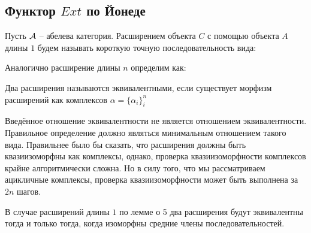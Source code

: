 \documentclass[../main.tex]{subfiles}
\begin{document}
\subsection{Функтор $Ext$ по Йонеде}
\begin{to_def}
Пусть $\mathcal{A}$ -- абелева категория. Расширением объекта $C$ с помощью объекта $A$ длины $1$ будем называть короткую точную последовательность вида:
\bee
{}
\eee
Аналогично расширение длины $n$ определим как:
\bee
{}
\eee
\end{to_def}
\begin{to_not_def}
Два расширения называются эквивалентными, если существует морфизм расширений как комплексов $\alpha = \{\alpha_i\}_i^{n}$
\bee
{}
\eee
\end{to_not_def}
\begin{to_com}
Введённое отношение эквивалентности не является отношением эквивалентности. Правильное определение должно являться минимальным отношением такого вида. Правильнее было бы сказать, что расширения должны быть квазиизоморфны как комплексы, однако, проверка квазиизоморфности комплексов крайне алгоритмически сложна. Но в силу того, что мы рассматриваем ацикличные комплексы, проверка квазиизоморфности может быть выполнена за $2n$ шагов.
\end{to_com}
В случае расширений длины $1$ по лемме о 5 два расширения будут эквивалентны тогда и только тогда, когда изоморфны средние члены последовательностей. 
\bee
{}
\end{document}
